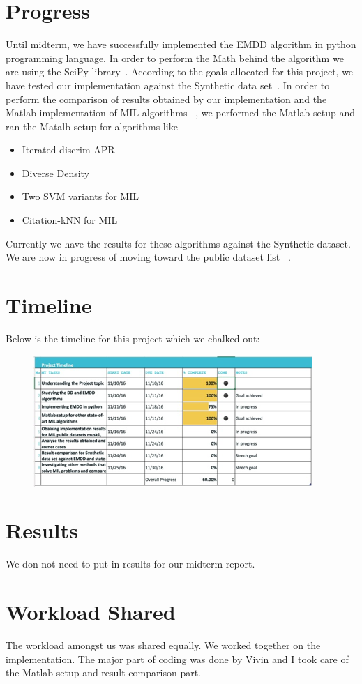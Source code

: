 \documentclass[conference,compsoc]{IEEEtran}
\begin{document}
\section{Progress}
Until midterm, we have successfully implemented the EMDD algorithm in python programming language. In order to perform the Math behind the algorithm we are using the SciPy library~\cite{Scipy}. According to the goals allocated for this project, we have tested our implementation against the Synthetic data set~\cite{SynthDataset}. In order to perform the comparison of results obtained by our implementation and the Matlab implementation of MIL algorithms ~\cite{MILlink}, we performed the Matlab setup and ran the Matalb setup for algorithms like 
\begin{itemize}
	\item Iterated-discrim APR
	\item Diverse Density
	\item Two SVM variants for MIL
	\item Citation-kNN for MIL
\end{itemize}
Currently we have the results for these algorithms against the Synthetic dataset. We are now in progress of moving toward the public dataset list ~\cite{MILlink,andrews2002support,Lichman:2013}.

\section{Timeline}
Below is the timeline for this project which we chalked out:
\begin{figure}[t]
	\includegraphics{timeline}
\end{figure}


\section{Results}
We don not need to put in results for our midterm report.

\section{Workload Shared}
The workload amongst us was shared equally. We worked together on the implementation. The major part of coding was done by Vivin and I took care of the Matlab setup and result comparison part. 
\end{document}

